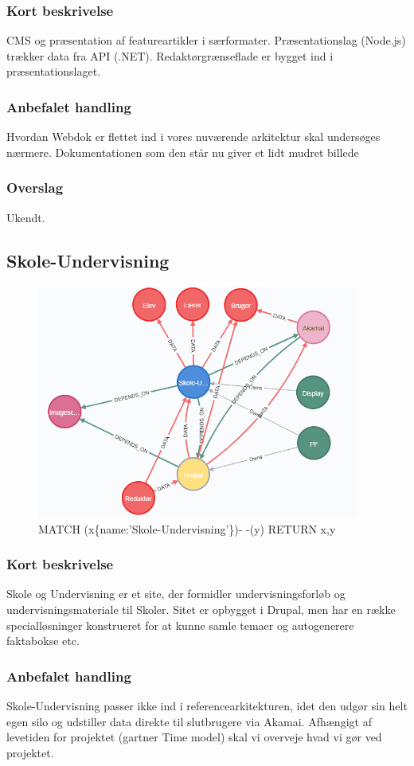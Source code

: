 \documentclass{article}
\begin{document}
\subsubsection{Kort beskrivelse}
CMS og præsentation af featureartikler i særformater.	
Præsentationslag (Node.js) trækker data fra API (.NET). Redaktørgrænseflade er bygget ind i præsentationslaget.
\subsubsection{Anbefalet handling}
Hvordan Webdok er flettet ind i vores nuværende arkitektur skal undersøges nærmere. Dokumentationen som den står nu giver et lidt mudret billede
\subsubsection{Overslag}
Ukendt.
\newpage{}
\clearpage


\subsection{Skole-Undervisning}
\begin{figure}[h]
\includegraphics[width=300pt]{Skole-Undervisning.PNG}
\caption{MATCH (x\{name:'Skole-Undervisning'\})- -(y) RETURN x,y}
\end{figure}
\subsubsection{Kort beskrivelse}
Skole og Undervisning er et site, der formidler undervisningsforløb og undervisningsmateriale til Skoler.  Sitet er opbygget i Drupal, men har en række specialløsninger konstrueret for at kunne samle temaer og autogenerere faktabokse etc. 
\subsubsection{Anbefalet handling}
Skole-Undervisning passer ikke ind i referencearkitekturen, idet den udgør sin helt egen silo og udstiller data direkte til slutbrugere via Akamai. 
Afhængigt af levetiden for projektet (gartner Time model) skal vi overveje hvad vi gør ved projektet.
\end{document}

